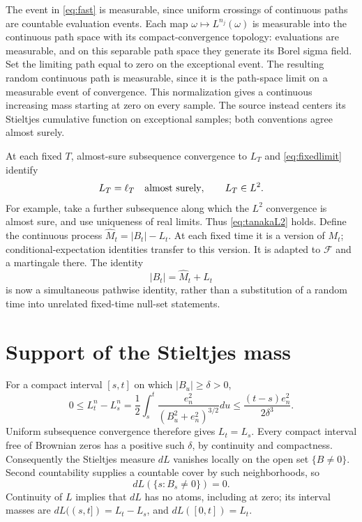 \documentclass[11pt]{article}
\newcommand{\F}{\mathcal F}
\begin{document}
The event in \eqref{eq:fast} is measurable, since uniform crossings
of continuous paths are countable evaluation events. Each map
$\omega\mapsto L^{n_j}(\omega)$ is measurable into the continuous
path space with its compact-convergence topology: evaluations are
measurable, and on this separable path space they generate its Borel
sigma field. Set the limiting path equal to zero on the exceptional
event. The resulting random continuous path is measurable, since it
is the path-space limit on a measurable event of convergence. This
normalization gives a continuous increasing mass starting at zero on
every sample. The source instead centers its Stieltjes cumulative
function on exceptional samples; both conventions agree almost surely.

At each fixed $T$, almost-sure subsequence convergence to $L_T$
and \eqref{eq:fixedlimit} identify
\begin{equation}\label{eq:coordinate}
 L_T=\ell_T\quad\hbox{almost surely},\qquad L_T\in L^2.
\end{equation}
For example, take a further subsequence along which the $L^2$
convergence is almost sure, and use uniqueness of real limits.
Thus \eqref{eq:tanakaL2} holds. Define the continuous process
$\widehat M_t=|B_t|-L_t$. At each fixed time it is a version of
$M_t$; conditional-expectation identities transfer to this version.
It is adapted to $\F$ and a martingale there. The identity
\begin{equation}\label{eq:alltanaka}
 |B_t|=\widehat M_t+L_t
\end{equation}
is now a simultaneous pathwise identity, rather than a substitution
of a random time into unrelated fixed-time null-set statements.

\section{Support of the Stieltjes mass}
For a compact interval $[s,t]$ on which $|B_u|\geq\delta>0$,
\[
 0\leq L_t^n-L_s^n
 =\frac12\int_s^t\frac{e_n^2}{(B_u^2+e_n^2)^{3/2}}du
 \leq\frac{(t-s)e_n^2}{2\delta^3}.
\]
Uniform subsequence convergence therefore gives $L_t=L_s$.
Every compact interval free of Brownian zeros has a positive such
$\delta$, by continuity and compactness. Consequently the Stieltjes
measure $dL$ vanishes locally on the open set $\{B\ne0\}$.
Second countability supplies a countable cover by such neighborhoods,
so
\begin{equation}\label{eq:support}
 dL(\{s:B_s\ne0\})=0.
\end{equation}
Continuity of $L$ implies that $dL$ has no atoms, including at zero;
its interval masses are
$dL((s,t])=L_t-L_s$, and $dL([0,t])=L_t$.
\end{document}
